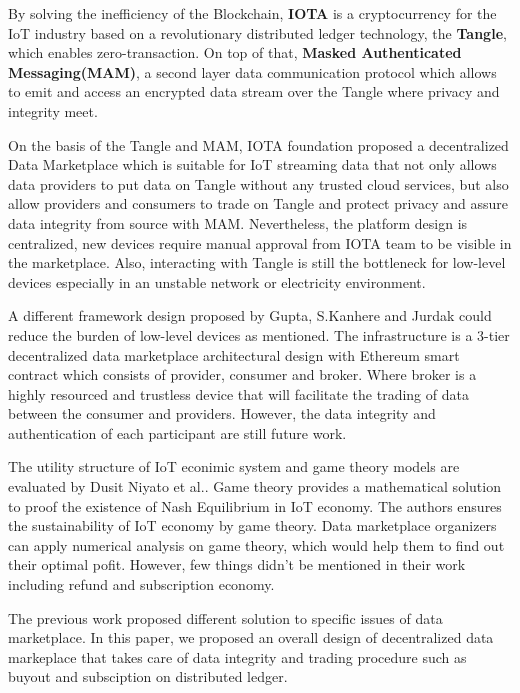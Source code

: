 \documentclass[journal,a4paper]{IEEEtran}
\begin{document}
By solving the inefficiency of the Blockchain, \textbf{IOTA}\cite{IOTAwhitepaper} is a cryptocurrency for the IoT industry based on a revolutionary distributed ledger technology, the \textbf{Tangle}, which enables zero-transaction. On top of that, \textbf{Masked Authenticated Messaging(MAM)}\cite{MAM}, a second layer data communication protocol which allows to emit and access an encrypted data stream over the Tangle where privacy and integrity meet. 

On the basis of the Tangle and MAM, IOTA foundation proposed a decentralized Data Marketplace\cite{IOTADataMarket} which is suitable for IoT streaming data that not only allows data providers to put data on Tangle without any trusted cloud services, but also allow providers and consumers to trade on Tangle and protect privacy and assure data integrity from source with MAM. Nevertheless, the platform design is centralized, new devices require manual approval from IOTA team to be visible in the marketplace. Also, interacting with Tangle is still the bottleneck for low-level devices especially in an unstable network or electricity environment.

A different framework design proposed by Gupta, S.Kanhere and Jurdak\cite{3tierDataMarket} could reduce the burden of low-level devices as mentioned. The infrastructure is a 3-tier decentralized data marketplace architectural design with Ethereum smart contract which consists of provider, consumer and broker. Where broker is a highly resourced and trustless device that will facilitate the trading of data between the consumer and providers. However, the data integrity and authentication of each participant are still future work.  

The utility structure of IoT econimic system and game theory models are evaluated by Dusit Niyato et al.\cite{UtilityStruct}. Game theory provides a mathematical solution to proof the existence of Nash Equilibrium in IoT economy. The authors ensures the sustainability of IoT economy by game theory. Data marketplace organizers can apply numerical analysis on game theory, which would help them to find out their optimal pofit. However, few things didn't be mentioned in their work including refund and subscription economy.

The previous work proposed different solution to specific issues of data marketplace. In this paper, we proposed an  overall design of decentralized data markeplace that takes care of data integrity and trading procedure such as buyout and subsciption on distributed ledger.
\end{document}
